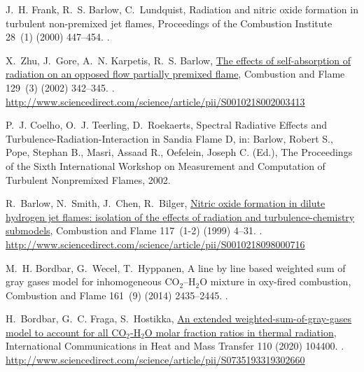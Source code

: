 \documentclass[preprint,12pt]{elsarticle}
\begin{document}
\begin{thebibliography}{10}
J.~H. Frank, R.~S. Barlow, C.~Lundquist, {Radiation and nitric oxide formation
in turbulent non-premixed jet flames}, {Proceedings of the Combustion
Institute} 28~(1) (2000) 447--454.
\newblock \href {http://dx.doi.org/10.1016/S0082-0784(00)80242-8}
  {}.

X.~Zhu, J.~Gore, A.~N. Karpetis, R.~S. Barlow,
\href{http://www.sciencedirect.com/science/article/pii/S0010218002003413}{{The
effects of self-absorption of radiation on an opposed flow partially premixed
flame}}, {Combustion and Flame} 129~(3) (2002) 342--345.
\newblock \href {http://dx.doi.org/10.1016/S0010-2180(02)00341-3}
  {}.
\newline\urlprefix\url{http://www.sciencedirect.com/science/article/pii/S0010218002003413}

P.~J. Coelho, O.~J. Teerling, D.~Roekaerts, {Spectral Radiative Effects and
Turbulence-Radiation-Interaction in Sandia Flame {D}}, in: {Barlow, Robert
S., Pope, Stephan B., Masri, Assaad R., Oefelein, Joseph C.} (Ed.), {The
Proceedings of the Sixth International Workshop on Measurement and
Computation of Turbulent Nonpremixed Flames}, 2002.

R.~Barlow, N.~Smith, J.~Chen, R.~Bilger,
\href{http://www.sciencedirect.com/science/article/pii/S0010218098000716}{{Nitric
oxide formation in dilute hydrogen jet flames: isolation of the effects of
radiation and turbulence-chemistry submodels}}, {Combustion and Flame}
117~(1-2) (1999) 4--31.
\newblock \href {http://dx.doi.org/10.1016/S0010-2180(98)00071-6}
  {}.
\newline\urlprefix\url{http://www.sciencedirect.com/science/article/pii/S0010218098000716}

M.~H. Bordbar, G.~Wecel, T.~Hyppanen, {A line by line based weighted sum of
gray gases model for inhomogeneous {CO$_2$–H$_2$O} mixture in oxy-fired
combustion}, {Combustion and Flame} 161~(9) (2014) 2435--2445.
\newblock \href {http://dx.doi.org/10.1016/j.combustflame.2014.03.013}
  {}.

H.~Bordbar, G.~C. Fraga, S.~Hostikka,
\href{http://www.sciencedirect.com/science/article/pii/S0735193319302660}{{An
extended weighted-sum-of-gray-gases model to account for all {CO$_2$-H$_2$O}
molar fraction ratios in thermal radiation}}, {International Communications
in Heat and Mass Transfer} 110 (2020) 104400.
\newblock \href {http://dx.doi.org/10.1016/j.icheatmasstransfer.2019.104400}
  {}.
\newline\urlprefix\url{http://www.sciencedirect.com/science/article/pii/S0735193319302660}


\end{thebibliography}
\end{document}

